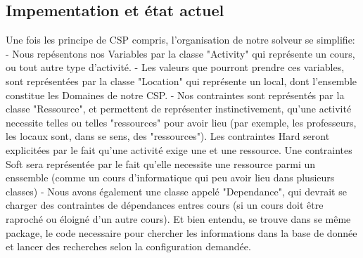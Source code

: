 \subsection{Impementation et état actuel}
Une fois les principe de CSP compris, l'organisation de notre solveur se simplifie: 
- Nous repésentons nos Variables par la classe "Activity" qui représente un cours, ou tout autre type d'activité.\newline
- Les valeurs que pourront prendre ces variables, sont représentées par la classe "Location" qui représente un local, dont l'ensemble constitue les Domaines de notre CSP.\newline
- Nos contraintes sont représentés par la classe "Ressource", et permettent de représenter instinctivement, qu'une activité necessite telles ou telles "ressources" pour avoir lieu (par exemple, les professeurs, les locaux sont, dans se sens, des "ressources"). Les contraintes Hard seront explicitées par le fait qu'une activité exige une et une ressource. Une contraintes Soft sera représentée par le fait qu'elle necessite une ressource parmi un enssemble (comme un cours d'informatique qui peu avoir lieu dans plusieurs classes) \newline
- Nous avons également une classe appelé "Dependance", qui devrait se charger des contraintes de dépendances entres cours (si un cours doit être raproché ou éloigné d'un autre cours). \newline
Et bien entendu, se trouve dans se même package, le code necessaire pour chercher les informations dans la base de donnée et lancer des recherches selon la configuration demandée.

\indent

